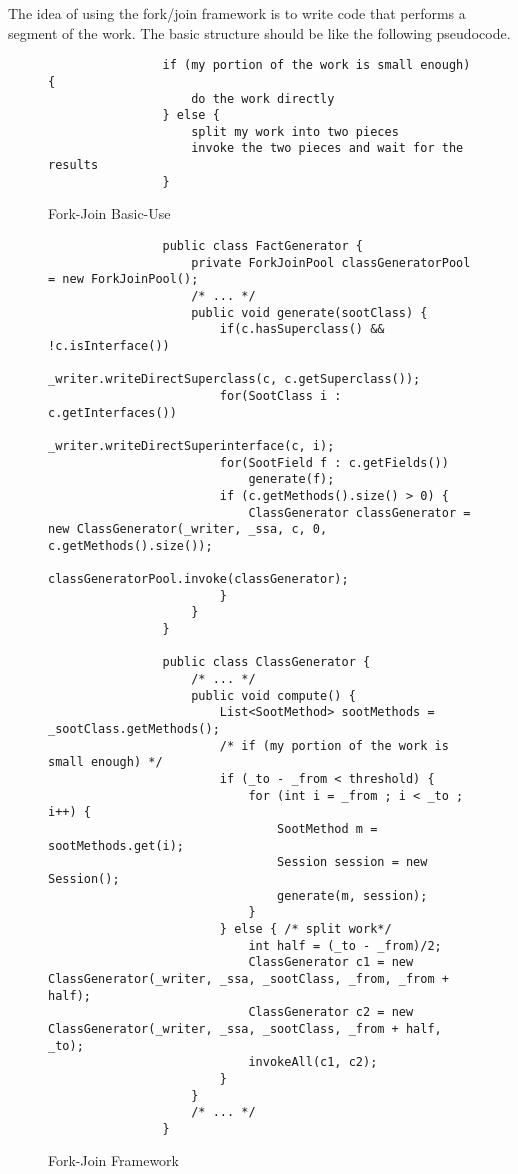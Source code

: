 \documentclass{dithesis}
\begin{document}
        The idea of using the fork/join framework is to write code that performs a segment of the work. The basic structure should be like the following pseudocode. \cite{Oracle Java Fork/Join Framework}
        \begin{figure}[H]
            \begin{lstlisting}
                if (my portion of the work is small enough) {
                    do the work directly
                } else {
                    split my work into two pieces
                    invoke the two pieces and wait for the results
                }
            \end{lstlisting}
        \caption{Fork-Join Basic-Use}
        \end{figure}

        \begin{figure}[H]
            \begin{lstlisting}
                public class FactGenerator {
                    private ForkJoinPool classGeneratorPool = new ForkJoinPool();
                    /* ... */
                    public void generate(sootClass) {
                        if(c.hasSuperclass() && !c.isInterface())
                            _writer.writeDirectSuperclass(c, c.getSuperclass());
                        for(SootClass i : c.getInterfaces())
                            _writer.writeDirectSuperinterface(c, i);
                        for(SootField f : c.getFields())
                            generate(f);
                        if (c.getMethods().size() > 0) {
                            ClassGenerator classGenerator = new ClassGenerator(_writer, _ssa, c, 0, c.getMethods().size());
                            classGeneratorPool.invoke(classGenerator);
                        }
                    }
                }

                public class ClassGenerator {
                    /* ... */
                    public void compute() {
                        List<SootMethod> sootMethods = _sootClass.getMethods();
                        /* if (my portion of the work is small enough) */
                        if (_to - _from < threshold) {
                            for (int i = _from ; i < _to ; i++) {
                                SootMethod m = sootMethods.get(i);
                                Session session = new Session();
                                generate(m, session);
                            }
                        } else { /* split work*/
                            int half = (_to - _from)/2;
                            ClassGenerator c1 = new ClassGenerator(_writer, _ssa, _sootClass, _from, _from + half);
                            ClassGenerator c2 = new ClassGenerator(_writer, _ssa, _sootClass, _from + half, _to);
                            invokeAll(c1, c2);
                        }
                    }
                    /* ... */
                }
            \end{lstlisting}
        \caption{Fork-Join Framework}
        \end{figure}
\end{document}
